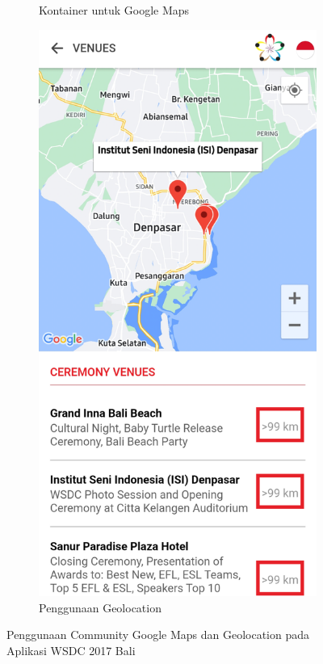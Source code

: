 \begin{itemize}
\begin{figure}[H]
\begin{subfigure}[b]{0.3\textwidth}
         \caption{Kontainer untuk Google Maps}
         \label{fig:VenuesMapPageKontainer}
     \end{subfigure}
     \hspace*{0.5in}
     \begin{subfigure}[b]{0.3\textwidth}
         \centering
         \includegraphics[width=\textwidth]{Gambar/jarakVenuesMap.png}
         \caption{Penggunaan Geolocation}
         \label{fig:jarakVenuesMap}
     \end{subfigure}
        \caption{Penggunaan Community Google Maps dan Geolocation pada Aplikasi WSDC 2017 Bali}
        \label{fig:VenuesMapPenggunaan}
\end{figure}
	

\end{itemize}
